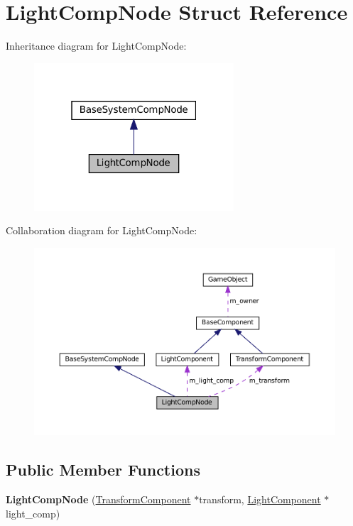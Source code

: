 \hypertarget{structLightCompNode}{}\section{Light\+Comp\+Node Struct Reference}
\label{structLightCompNode}


Inheritance diagram for Light\+Comp\+Node\+:
\nopagebreak
\begin{figure}[H]
\begin{center}
\leavevmode
\includegraphics[width=211pt]{structLightCompNode__inherit__graph}
\end{center}
\end{figure}


Collaboration diagram for Light\+Comp\+Node\+:
\nopagebreak
\begin{figure}[H]
\begin{center}
\leavevmode
\includegraphics[width=350pt]{structLightCompNode__coll__graph}
\end{center}
\end{figure}
\subsection*{Public Member Functions}
\begin{DoxyCompactItemize}
\item 
\mbox{\label{structLightCompNode_a4154dc879adf648086b0ec933c5f1139}} 
{\bfseries Light\+Comp\+Node} (\hyperlink{classTransformComponent}{Transform\+Component} $\ast$transform, \hyperlink{classLightComponent}{Light\+Component} $\ast$light\+\_\+comp)
\end{DoxyCompactItemize}
